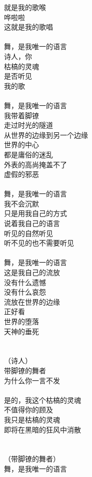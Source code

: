 就是我的歌喉\\
哗啦啦\\
这就是我的歌唱\\
\\
舞，是我唯一的语言\\
诗人，你\\
枯槁的灵魂\\
是否听见\\
我的歌\\
\\
舞，是我唯一的语言\\
我带着脚镣\\
走过时光的隧道\\
从世界的边缘到另一个边缘\\
世界的中心\\
都是庸俗的迷乱\\
外表的高尚掩盖不了\\
虚假的邪恶\\
\\
舞，是我唯一的语言\\
我不会沉默\\
只是用我自己的方式\\
说着我自己的语言\\
听见的自然听见\\
听不见的也不需要听见\\
\\
舞，是我唯一的语言\\
这是我自己的流放\\
没有什么遗憾\\
没有什么哀怨\\
流放在世界的边缘\\
正好看\\
世界的堕落\\
天神的垂死\\
\\
\\
（诗人）\\
带脚镣的舞者\\
为什么你一言不发\\
\\
是的，我这个枯槁的灵魂\\
不值得你的顾及\\
我只是枯槁的灵魂\\
即将在黑暗的狂风中消散\\
\\
\\
（带脚镣的舞者）\\
舞，是我唯一的语言\\
